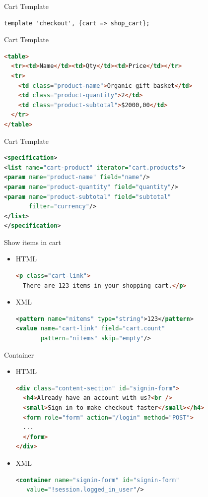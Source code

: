 \begin{frame}[fragile]{Cart Template}
\begin{lstlisting}
template 'checkout', {cart => shop_cart};
\end{lstlisting}
\end{frame}

\begin{frame}[fragile]{Cart Template}
\begin{lstlisting}[language=html]
<table>
  <tr><td>Name</td><td>Qty</td><td>Price</td></tr>
  <tr>
    <td class="product-name">Organic gift basket</td>
    <td class="product-quantity">2</td>
    <td class="product-subtotal">$2000,00</td>
  </tr>
</table>
\end{lstlisting}
\end{frame}

\begin{frame}[fragile]{Cart Template}
\begin{lstlisting}[language=xml]
<specification>
<list name="cart-product" iterator="cart.products">
<param name="product-name" field="name"/>
<param name="product-quantity" field="quantity"/>
<param name="product-subtotal" field="subtotal" 
       filter="currency"/>
</list>
</specification>
\end{lstlisting}
\end{frame}

\begin{frame}[fragile]{Show items in cart}
\begin{itemize}
\item HTML
\begin{lstlisting}[language=html]
<p class="cart-link">
  There are 123 items in your shopping cart.</p>
\end{lstlisting}
\item XML
\begin{lstlisting}[language=xml]
<pattern name="nitems" type="string">123</pattern>
<value name="cart-link" field="cart.count"
       pattern="nitems" skip="empty"/>
\end{lstlisting}
\end{itemize}
\end{frame}

\begin{frame}[fragile]{Container}
\begin{itemize}
\item HTML
\begin{lstlisting}[language=html]
<div class="content-section" id="signin-form">
  <h4>Already have an account with us?<br />
  <small>Sign in to make checkout faster</small></h4>
  <form role="form" action="/login" method="POST">
  ...
  </form>
</div>
\end{lstlisting}
\item XML
\begin{lstlisting}[language=xml]
<container name="signin-form" id="signin-form" 
   value="!session.logged_in_user"/>
\end{lstlisting}
\end{itemize}
\end{frame}

